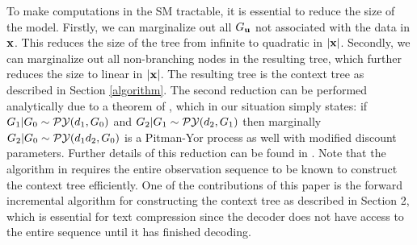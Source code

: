 To make computations in the SM tractable, it is essential to reduce the size
of the model.  Firstly, we can marginalize out all $G_\ubf$ not associated
with the data in $\xbf$.  This reduces the size of the tree from infinite to
quadratic in $|\xbf|$.  Secondly, we can marginalize out all non-branching
nodes in the resulting tree, which further reduces the size to linear in
$|\xbf|$.  The resulting tree is the context tree as described in Section
\ref{algorithm}.  The second reduction can be performed analytically due to a
theorem of \citet{Pitman1999}, which in our situation simply states: if
$G_1|G_0 \sim \py(d_1,G_0)$ and $G_2|G_1 \sim \py(d_2, G_1)$ then marginally
$G_2|G_0 \sim \py(d_1d_2,G_0)$ is a Pitman-Yor process as well with modified
discount parameters.  Further details of this reduction can be found in
\citep{wood2009sms}.  Note that the algorithm in \citep{wood2009sms} requires
the entire observation sequence to be known to construct the context tree
efficiently.  One of the contributions of this paper is the forward incremental
algorithm for constructing the context tree as described in Section 2, which is essential for text compression since the decoder does not have access to the entire sequence until it has finished decoding. 



% 

